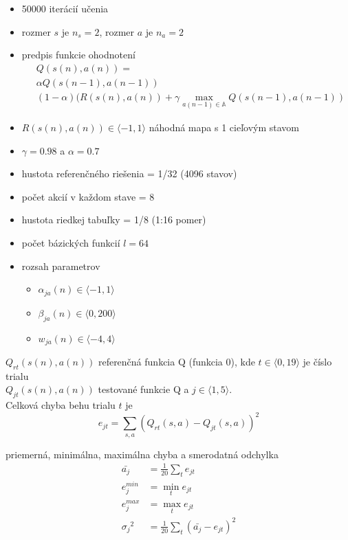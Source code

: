 \begin{itemize}
\item 50000 iterácií učenia
\item rozmer $s$ je $n_s = 2$, rozmer $a$ je $n_a = 2$
\item predpis funkcie ohodnotení
\begin{align}
&Q(s(n),a(n)) = \nonumber \\
&\alpha Q(s(n-1),a(n-1)) \nonumber \\
&(1- \alpha)(R(s(n),a(n)) + \gamma \max_{a(n-1) \in \mathbb{A}} Q(s(n-1), a(n-1)) \nonumber
\end{align}

\item $R(s(n), a(n)) \in \langle -1, 1 \rangle$ náhodná mapa s 1 cieľovým stavom
\item $\gamma = 0.98$ a $\alpha = 0.7$
\item hustota referenčného riešenia = 1/32  (4096 stavov)
\item počet akcií v každom stave = 8
\item hustota riedkej tabuľky = 1/8  (1:16 pomer)
\item počet bázických funkcií $l = 64$
\item rozsah parametrov
    \begin{itemize}
      \item $\alpha_{ja}(n) \in \langle -1, 1 \rangle$
      \item $\beta_{ja}(n) \in \langle 0, 200 \rangle$
      \item $w_{ja}(n) \in \langle -4, 4 \rangle$
    \end{itemize}
\end{itemize}

$Q_{rt}(s(n),a(n))$ referenčná funkcia Q (funkcia 0), kde $t \in \langle 0, 19 \rangle $ je číslo trialu  \\
$Q_{jt}(s(n),a(n))$ testované funkcie Q a $j \in \langle 1, 5 \rangle $. \\

Celková chyba behu trialu $t$ je \\
\begin{equation}
e_{jt} = \sum\limits_{s, a}{(Q_{rt}(s,a) - Q_{jt}(s,a))^2}  \nonumber
\end{equation}

priemerná, minimálna, maximálna chyba a smerodatná odchylka \\
\begin{align}
\bar{a_j} &= \frac{1}{20}\sum\limits_{t}{e_{jt}}  \nonumber \\
{e^{min}_j} &= \min_{t}{e_{jt}}  \nonumber \\
{e^{max}_j} &= \max_{t}{e_{jt}}  \nonumber \\
{\sigma_j}^2 &= \frac{1}{20}\sum\limits_{t}{(\bar{a_j} - e_{jt})^2}  \nonumber
\end{align}

